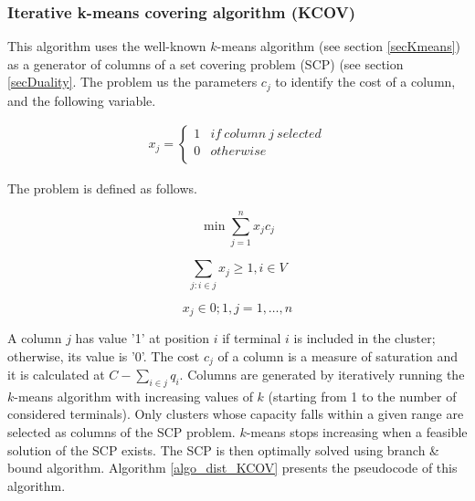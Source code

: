 \subsubsection{Iterative k-means covering algorithm (KCOV)} \label{secKCOV}
This algorithm uses the well-known $k$-means algorithm (see section \ref{secKmeans}) as a generator of columns of a set covering problem (SCP) (see section \ref{secDuality}. The problem us the parameters $c_j$ to identify the cost of a column, and the following variable.

\begin{equation}
   \begin{split}
   x_{j}=\left\{
                \begin{array}{ll}
                  1 & if\ column\ j\ selected \\
                  0 & otherwise\\
                \end{array}
              \right.
   \end{split}
\end{equation}

The problem is defined as follows.

\begin{equation}
    \min{\sum_{j=1}^{n}{x_jc_j}}
\end{equation}

\begin{equation}
    \sum_{j:i\in j}{x_j\geq1} , i\in V
\end{equation}

\begin{equation}
    x_j\in{0;1} , j=1,\ldots,n
\end{equation}

A column $j$ has value '1' at position $i$ if terminal $i$ is included in the cluster; otherwise, its value is '0'. The cost $c_j$ of a column is a measure of saturation and it is calculated at $C-\sum_{i\in j} q_i$. Columns are generated by iteratively running the $k$-means algorithm with increasing values of $k$ (starting from 1 to the number of considered terminals). Only clusters whose capacity falls within a given range are selected as columns of the SCP problem. $k$-means stops increasing when a feasible solution of the SCP exists. The SCP is then optimally solved using branch \& bound algorithm. Algorithm \ref{algo_dist_KCOV} presents the pseudocode of this algorithm.

